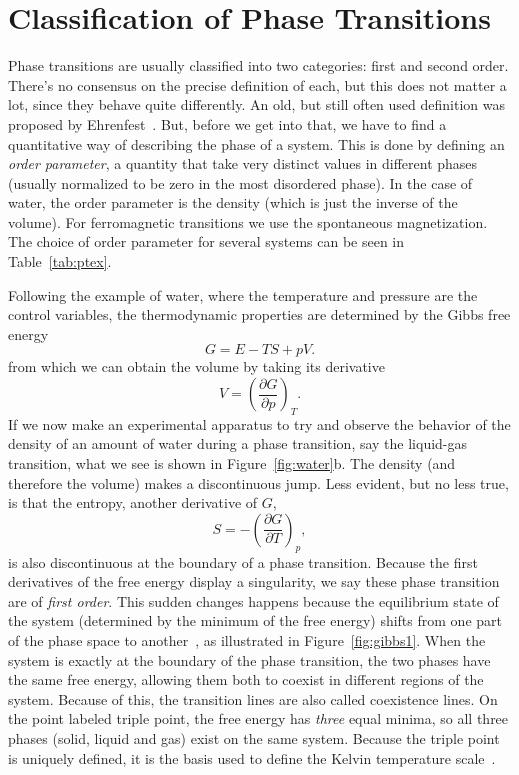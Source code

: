 \section{Classification of Phase Transitions}
\label{sec:classification}

Phase transitions are usually classified into two categories: first and second
order. There's no consensus on the precise definition of each, but this does
not matter a lot, since they behave quite differently. An old, but still often
used definition was proposed by Ehrenfest~\cite{Jaeger1998}. But, before we get
into that, we have to find a quantitative way of describing the phase of a
system. This is done by defining an \textit{order parameter}, a quantity that
take very distinct values in different phases (usually normalized to be zero in
the most disordered phase). In the case of water, the order parameter is the
density (which is just the inverse of the volume). For ferromagnetic
transitions we use the spontaneous magnetization. The choice of order parameter
for several systems can be seen in Table~\ref{tab:ptex}.

Following the example of water, where the temperature and pressure are the
control variables, the thermodynamic properties are determined by the Gibbs
free energy
\begin{equation}
    G=E-TS+pV.
\end{equation}
from which we can obtain the volume by taking its derivative
\begin{equation}
    V={\left(\frac{\partial G}{\partial p}\right)}_T.
\end{equation}
If we now make an experimental apparatus to try and observe the behavior of the
density of an amount of water during a phase transition, say the liquid-gas
transition, what we see is shown in Figure~\ref{fig:water}b. The density (and
therefore the volume) makes a discontinuous jump. Less evident, but no less
true, is that the entropy, another derivative of $G$,
\begin{equation}
    S=-{\left(\frac{\partial G}{\partial T}\right)}_p,
\end{equation}
is also discontinuous at the boundary of a phase transition. Because the first
derivatives of the free energy display a singularity, we say these phase
transition are of \textit{first order}. This sudden changes happens because the
equilibrium state of the system (determined by the minimum of the free energy)
shifts from one part of the phase space to another~\cite{Callen1985}, as
illustrated in Figure~\ref{fig:gibbs1}. When the system is exactly at the
boundary of the phase transition, the two phases have the same free energy,
allowing them both to coexist in different regions of the system. Because of
this, the transition lines are also called coexistence lines. On the point
labeled triple point, the free energy has \textit{three} equal minima, so all
three phases (solid, liquid and gas) exist on the same system. Because the
triple point is uniquely defined, it is the basis used to define the Kelvin
temperature scale~\cite{Fermi1956}.

